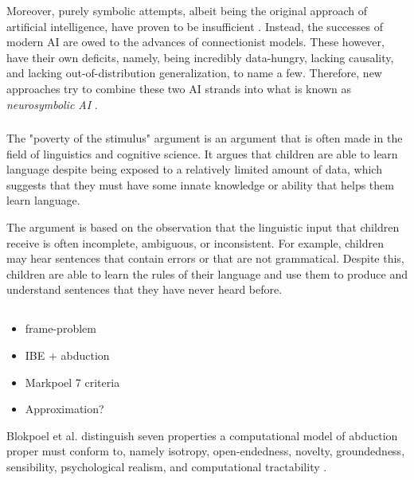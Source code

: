 Moreover, purely symbolic attempts, albeit being the original approach of artificial intelligence, have proven to be insufficient \cite{garcez2020neurosymbolic}. Instead, the successes of modern AI are owed to the advances of connectionist models. These however, have their own deficits, namely, being incredibly data-hungry, lacking causality, and lacking out-of-distribution generalization, to name a few. Therefore, new approaches try to combine these two AI strands into what is known as \emph{neurosymbolic AI} \cite{garcez2020neurosymbolic}.




\subsubsection{}

The "poverty of the stimulus" argument is an argument that is often made in the field of linguistics and cognitive science. It argues that children are able to learn language despite being exposed to a relatively limited amount of data, which suggests that they must have some innate knowledge or ability that helps them learn language.

The argument is based on the observation that the linguistic input that children receive is often incomplete, ambiguous, or inconsistent. For example, children may hear sentences that contain errors or that are not grammatical. Despite this, children are able to learn the rules of their language and use them to produce and understand sentences that they have never heard before.




\subsection{}
\begin{itemize}
    \item frame-problem
    \item IBE + abduction
    \item Markpoel 7 criteria
    \item Approximation?
\end{itemize}

Blokpoel et al. distinguish seven properties a computational model of abduction proper must conform to, namely isotropy, open-endedness, novelty, groundedness, sensibility, psychological realism, and computational tractability \cite{blokpoel2018deep}. 
